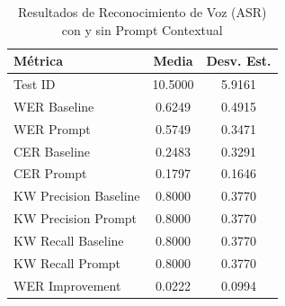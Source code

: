 \begin{table}[ht]
\centering
\caption{Resultados de Reconocimiento de Voz (ASR) con y sin Prompt Contextual}
\label{tab:asr_metrics}
\begin{tabular}{lcc}
\toprule
\textbf{Métrica} & \textbf{Media} & \textbf{Desv. Est.} \\
\midrule
Test ID & 10.5000 & 5.9161 \\
WER Baseline & 0.6249 & 0.4915 \\
WER Prompt & 0.5749 & 0.3471 \\
CER Baseline & 0.2483 & 0.3291 \\
CER Prompt & 0.1797 & 0.1646 \\
KW Precision Baseline & 0.8000 & 0.3770 \\
KW Precision Prompt & 0.8000 & 0.3770 \\
KW Recall Baseline & 0.8000 & 0.3770 \\
KW Recall Prompt & 0.8000 & 0.3770 \\
WER Improvement & 0.0222 & 0.0994 \\
\bottomrule
\end{tabular}
\end{table}